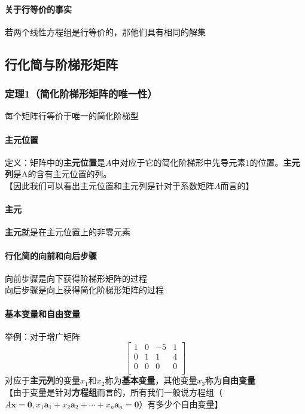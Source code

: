 \documentclass{article}
\newcommand{\ve}{\boldsymbol}
\begin{document}
\begin{CJK}{UTF8}{gkai}
\paragraph{关于行等价的事实\\}
若两个线性方程组是行等价的，那他们具有相同的解集\\
\subsection{行化简与阶梯形矩阵}
\subsubsection{定理1（简化阶梯形矩阵的唯一性）}
每个矩阵行等价于唯一的简化阶梯型\\
\paragraph{主元位置\\}
定义：矩阵中的\textbf{主元位置}是$A$中对应于它的简化阶梯形中先导元素1的位置。\textbf{主元列}是A的含有主元位置的列。\\
【因此我们可以看出主元位置和主元列是针对于系数矩阵$A$而言的】\\
\paragraph{主元\\}
\textbf{主元}就是在主元位置上的非零元素\\
\paragraph{行化简的向前和向后步骤\\}
向前步骤是向下获得阶梯形矩阵的过程\\
向后步骤是向上获得简化阶梯形矩阵的过程\\
\paragraph{基本变量和自由变量\\}
举例：对于增广矩阵\\
\[\begin{bmatrix}
1&0&-5&1\\
0&1&1&4\\
0&0&0&0\\

\end{bmatrix}
\]
对应于\textbf{主元列}的变量$x_1$和$x_2$称为\textbf{基本变量}，其他变量$x_3$称为\textbf{自由变量}\\
【由于变量是针对\textbf{方程组}而言的，所有我们一般说方程组（$A\ve{x}=\ve{0},x_1\ve{a}_1+x_2\ve{a}_2+\cdots+x_n\ve{a}_n=\ve{0}$）有多少个自由变量】\\

\end{CJK}
\end{document}

